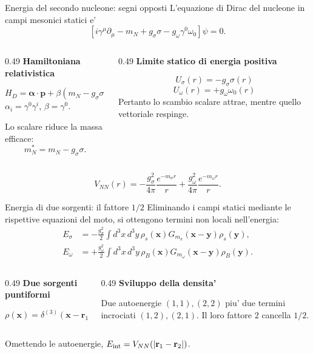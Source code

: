 \begin{frame}{Energia del secondo nucleone: segni opposti}
\footnotesize
L'equazione di Dirac del nucleone in campi mesonici statici e'
\[
\left[i\gamma^\mu\partial_\mu-m_N+g_\sigma\sigma
-g_\omega\gamma^0\omega_0\right]\psi=0.
\]
\begin{columns}[T,onlytextwidth]
\begin{column}{0.49\textwidth}
\textbf{Hamiltoniana relativistica}\par\smallskip
\[
H_D=\boldsymbol\alpha\!\cdot\!\mathbf p
+\beta(m_N-g_\sigma\sigma)
+g_\omega\omega_0
\]
\(\alpha_i=\gamma^0\gamma^i\), \(\beta=\gamma^0\).\par
Lo scalare riduce la massa efficace:
\[
m_N^*=m_N-g_\sigma\sigma.
\]
\end{column}
\begin{column}{0.49\textwidth}
\textbf{Limite statico di energia positiva}\par\smallskip
\[
U_\sigma(r)=-g_\sigma\sigma(r)
\]
\[
U_\omega(r)=+g_\omega\omega_0(r)
\]
Pertanto lo scambio scalare attrae,
mentre quello vettoriale respinge.
\end{column}
\end{columns}
\medskip
\[
V_{NN}(r)=
-\frac{g_\sigma^2}{4\pi}\frac{e^{-m_\sigma r}}r
+\frac{g_\omega^2}{4\pi}\frac{e^{-m_\omega r}}r.
\]
\end{frame}

\begin{frame}{Energia di due sorgenti: il fattore $1/2$}
\footnotesize
Eliminando i campi statici mediante le rispettive equazioni del moto,
si ottengono termini non locali nell'energia:
\[
\begin{aligned}
E_\sigma&=-\frac{g_\sigma^2}{2}\int d^3x\,d^3y\,
\rho_s(\mathbf x)G_{m_\sigma}(\mathbf x-\mathbf y)\rho_s(\mathbf y),\\
E_\omega&=+\frac{g_\omega^2}{2}\int d^3x\,d^3y\,
\rho_B(\mathbf x)G_{m_\omega}(\mathbf x-\mathbf y)\rho_B(\mathbf y).
\end{aligned}
\]
\begin{columns}[T,onlytextwidth]
\begin{column}{0.49\textwidth}
\textbf{Due sorgenti puntiformi}\par\smallskip
\[
\rho(\mathbf x)=\delta^{(3)}(\mathbf x-\mathbf r_1)
+\delta^{(3)}(\mathbf x-\mathbf r_2)
\]
\end{column}
\begin{column}{0.49\textwidth}
\textbf{Sviluppo della densita'}\par\smallskip
Due autoenergie \((1,1),(2,2)\)
piu' due termini incrociati \((1,2),(2,1)\).
Il loro fattore \(2\) cancella \(1/2\).
\end{column}
\end{columns}
\smallskip
Omettendo le autoenergie, \(E_{\rm int}=V_{NN}(|\mathbf r_1-\mathbf r_2|)\).
\end{frame}

